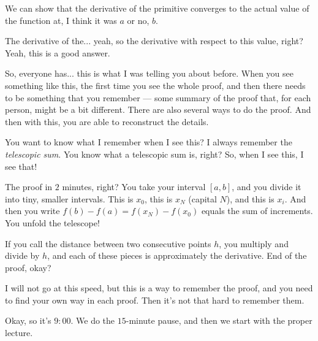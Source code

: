 \begin{student-interaction}
We can show that the derivative of the primitive converges to the actual value of the function at, I think it was $a$ or no, $b$.
\end{student-interaction}

\begin{spoken-clean}[continued]
The derivative of the... yeah, so the derivative with respect to this value, right? Yeah, this is a good answer.

So, everyone has... this is what I was telling you about before. When you see something like this, the first time you see the whole proof, and then there needs to be something that you remember --- some summary of the proof that, for each person, might be a bit different. There are also several ways to do the proof. And then with this, you are able to reconstruct the details.

You want to know what I remember when I see this? I always remember the \emph{telescopic sum}. You know what a telescopic sum is, right? So, when I see this, I see that!


The proof in $2$ minutes, right? You take your interval $[a, b]$, and you divide it into tiny, smaller intervals. This is $x_0$, this is $x_N$ (capital $N$), and this is $x_i$. And then you write $f(b) - f(a) = f(x_N) - f(x_0)$ equals the sum of increments. You unfold the telescope!

If you call the distance between two consecutive points $h$, you multiply and divide by $h$, and each of these pieces is approximately the derivative. End of the proof, okay?

I will not go at this speed, but this is a way to remember the proof, and you need to find your own way in each proof. Then it's not that hard to remember them.

Okay, so it's $9:00$. We do the $15$-minute pause, and then we start with the proper lecture.
\end{spoken-clean}

